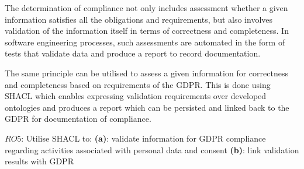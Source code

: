The determination of compliance not only includes assessment whether a given information satisfies all the obligations and requirements, but also involves validation of the information itself in terms of correctness and completeness.
In software engineering processes, such assessments are automated in the form of tests that validate data and produce a report to record documentation.

The same principle can be utilised to assess a given information for correctness and completeness based on requirements of the GDPR.
This is done using SHACL which enables expressing validation requirements over developed ontologies and produces a report which can be persisted and linked back to the GDPR for documentation of compliance.
\begin{framed}
$RO5$: Utilise SHACL to:
\newline\indent\indent\textbf{(a)}: validate information for GDPR compliance regarding activities associated with personal data and consent
\newline\indent\indent\textbf{(b)}: link validation results with GDPR
\end{framed}


